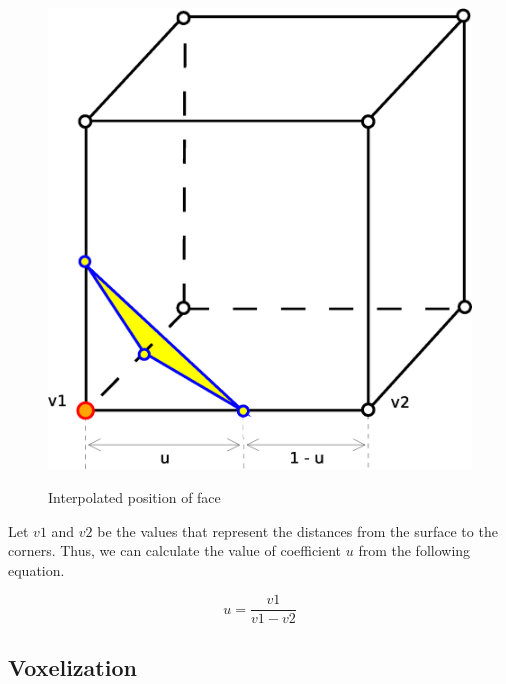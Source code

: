 \begin{figure}[!htbp]
\centering
\includegraphics[scale=0.35]{../img/marc_cub_inter.eps}
\label{fig:mc_interpolation}
\caption{Interpolated position of face}
\end{figure}
Let $v1$ and $v2$ be the values that represent the distances from the surface to the corners.
Thus, we can calculate the value of coefficient $u$ from the following equation.

\begin{equation}
u = \frac{v1}{v1-v2}
\end{equation}


\subsection{Voxelization}
\label{sub:vox}

